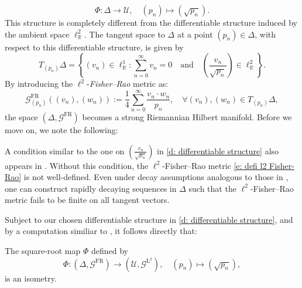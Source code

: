 \documentclass[runningheads]{llncs}
\begin{document}
\[
	\varPhi: \Delta \longrightarrow \mathcal{U}, \quad (p_n) \mapsto (\sqrt{p_n}).
\]
This structure is completely different from the differentiable structure induced by the ambient space $\ell^2_{\mathbb{R}}$. The tangent space to $\Delta$ at a point $(p_n) \in \Delta$, with respect to this differentiable structure, is given by
\begin{equation}\label{d: differentiable structure}
    T_{(p_n)}\Delta = \left\{ (v_n) \in \ell^1_{\mathbb{R}} : \sum_{n=0}^{\infty} v_n = 0 \quad \text{and} \quad \left(\frac{v_n}{\sqrt{p_n}}\right) \in \ell^2_{\mathbb{R}} \right\}.
\end{equation}
By introducing the $\ell^2$-\emph{Fisher--Rao} metric as:
\begin{equation}\label{e: defi l2 Fisher-Rao}
	\mathcal{G}^{\mathrm{FR}}_{(p_n)}\left((v_n), (w_n) \right) := \frac{1}{4}\sum_{n=0}^{\infty} \frac{v_n \cdot w_n}{p_n}, \quad \forall (v_n), (w_n) \in T_{(p_n)}\Delta,
\end{equation}
the space $(\Delta, \mathcal{G}^{\mathrm{FR}})$ becomes a strong Riemannian Hilbert manifold. Before we move on, we note the following:

\begin{remark}\label{r: the right diff strcuture}
A condition similar to the one on \( \left(\frac{v_n}{\sqrt{p_n}}\right) \) in \eqref{d: differentiable structure} also appears in \cite[§2]{Friedrich1991}. Without this condition, the \( \ell^2 \)-Fisher–Rao metric \eqref{e: defi l2 Fisher-Rao} is not well-defined. Even under decay assumptions analogous to those in \cite[§3.5]{MichorMumfordZoo}, one can construct rapidly decaying sequences in \( \Delta \) such that the \( \ell^2 \)-Fisher–Rao metric fails to be finite on all tangent vectors. 
\end{remark}
Subject to our chosen differentiable structure in \eqref{d: differentiable structure}, and by a computation similiar to \cite[Thm. 3.1]{khesin_GAFA}, it follows directly that:

\begin{theorem}\label{t: square root map is isometry}
The square-root map \( \varPhi \) defined by
\[
\varPhi: (\Delta, \mathcal{G}^{\mathrm{FR}}) \longrightarrow (\mathcal{U}, \mathcal{G}^{\mathrm{L}^2}), \quad (p_n) \mapsto (\sqrt{p_n}),
\]
is an isometry.
\end{theorem}
\end{document}
